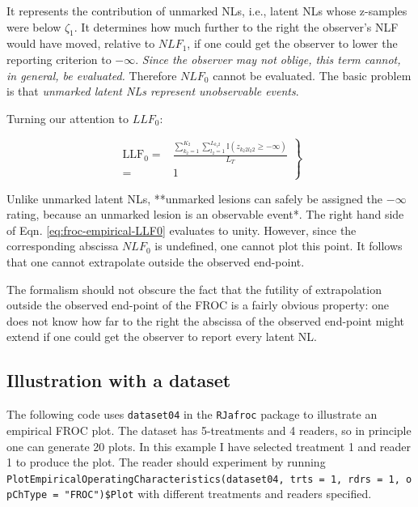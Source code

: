 \documentclass[
]{book}
\begin{document}
It represents the contribution of unmarked NLs, i.e., latent NLs whose z-samples were below \(\zeta_1\). It determines how much further to the right the observer's NLF would have moved, relative to \(NLF_1\), if one could get the observer to lower the reporting criterion to \(-\infty\). \emph{Since the observer may not oblige, this term cannot, in general, be evaluated.} Therefore \(NLF_0\) cannot be evaluated. The basic problem is that \emph{unmarked latent NLs represent unobservable events}.

Turning our attention to \(LLF_0\):

\begin{equation}
\left.
\begin{aligned}
\text{LLF}_0 =& \frac{ \sum_{k_2=1}^{K_2} \sum_{l_2=1}^{L_{k_2 2}} \mathbb{I} \left ( z_{k_2 2 l_2 2} \geq  -\infty  \right ) }{L_T}\\
=& 1
\end{aligned}
\right \}
\label{eq:froc-empirical-LLF0}
\end{equation}

Unlike unmarked latent NLs, **unmarked lesions can safely be assigned the \(-\infty\) rating, because an unmarked lesion is an observable event*. The right hand side of Eqn. \eqref{eq:froc-empirical-LLF0} evaluates to unity. However, since the corresponding abscissa \(NLF_0\) is undefined, one cannot plot this point. It follows that one cannot extrapolate outside the observed end-point.

The formalism should not obscure the fact that the futility of extrapolation outside the observed end-point of the FROC is a fairly obvious property: one does not know how far to the right the abscissa of the observed end-point might extend if one could get the observer to report every latent NL.

\hypertarget{froc-empirical-froc-plot-illustration}{%
\subsection{Illustration with a dataset}\label{froc-empirical-froc-plot-illustration}}

The following code uses \texttt{dataset04} \citep{zanca2009evaluation} in the \texttt{RJafroc} package to illustrate an empirical FROC plot. The dataset has 5-treatments and 4 readers, so in principle one can generate 20 plots. In this example I have selected treatment 1 and reader 1 to produce the plot. The reader should experiment by running \texttt{PlotEmpiricalOperatingCharacteristics(dataset04,\ trts\ =\ 1,\ rdrs\ =\ 1,\ opChType\ =\ "FROC")\$Plot} with different treatments and readers specified.
\end{document}
